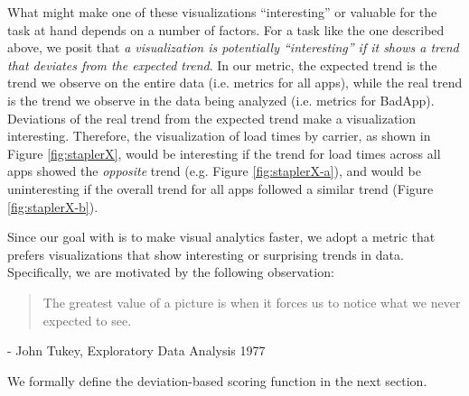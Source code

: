 \begin{example}
What might make one of these visualizations ``interesting'' or valuable for the 
task at hand depends on a number of factors.
For a task like the one described above, we posit that 
{\em a visualization is 
potentially ``interesting'' if it shows
a trend that deviates from the expected trend}.
In our metric, the expected trend is the trend we observe on the entire data (i.e. metrics for
all apps), while the real trend is the trend we observe in the data being analyzed (i.e. 
metrics for BadApp).
Deviations of the real trend from the expected trend make a visualization interesting.
Therefore, the visualization of load times by carrier, as shown in Figure
\ref{fig:staplerX}, would be interesting if the trend for load times across all
apps showed the {\it opposite} trend (e.g. Figure \ref{fig:staplerX-a}), and would
be uninteresting if the overall trend for all apps followed a similar trend 
(Figure \ref{fig:staplerX-b}).
\end{example}




Since our goal with \SeeDB is to make visual analytics faster, we adopt a metric
that prefers visualizations that show interesting or surprising trends in data.
Specifically, we are motivated by the following observation:
\begin{quotation}
The greatest value of a picture is when it forces us to notice what we never expected to see.
\end{quotation} 
\begin{flushright} 
- John Tukey, Exploratory Data Analysis 1977
\end{flushright}
We formally define the deviation-based scoring function in the next section. 


